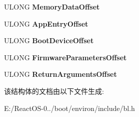 \begin{DoxyCompactItemize}
U\+L\+O\+NG {\bfseries Memory\+Data\+Offset}
\item 
\mbox{\label{struct___b_o_o_t___a_p_p_l_i_c_a_t_i_o_n___p_a_r_a_m_e_t_e_r___b_l_o_c_k_a4cc4f410ee417dd01635533300adcb10}} 
U\+L\+O\+NG {\bfseries App\+Entry\+Offset}
\item 
\mbox{\label{struct___b_o_o_t___a_p_p_l_i_c_a_t_i_o_n___p_a_r_a_m_e_t_e_r___b_l_o_c_k_a92efb492fc383f918324b41d47cd83d0}} 
U\+L\+O\+NG {\bfseries Boot\+Device\+Offset}
\item 
\mbox{\label{struct___b_o_o_t___a_p_p_l_i_c_a_t_i_o_n___p_a_r_a_m_e_t_e_r___b_l_o_c_k_ae1c1a40f83828c9b464c7e824fc68305}} 
U\+L\+O\+NG {\bfseries Firmware\+Parameters\+Offset}
\item 
\mbox{\label{struct___b_o_o_t___a_p_p_l_i_c_a_t_i_o_n___p_a_r_a_m_e_t_e_r___b_l_o_c_k_a1f9811d7bcb55666d8dba0354c9069b1}} 
U\+L\+O\+NG {\bfseries Return\+Arguments\+Offset}
\end{DoxyCompactItemize}


该结构体的文档由以下文件生成\+:\begin{DoxyCompactItemize}
\item 
E\+:/\+React\+O\+S-\/0../boot/environ/include/bl.\+h\end{DoxyCompactItemize}
